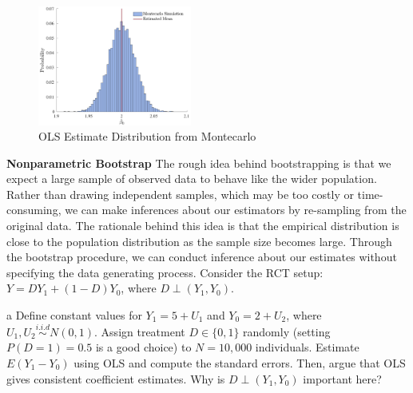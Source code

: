 \documentclass{article}
\begin{document}
\begin{solution}
\begin{equation*}
\end{equation*}
\begin{figure}[htb]
    \centering
    \caption{OLS Estimate Distribution from Montecarlo}
    \label{ea3:ps1:q3a:fig1}
    \includegraphics[width=0.45\textwidth]{Figures/p3qa.pdf}
\end{figure}

\end{solution}
\FloatBarrier
\underline{\hspace{\textwidth}}
\textbf{Nonparametric Bootstrap}
The rough idea behind bootstrapping is that we expect a large sample of observed data to behave like the wider population. Rather than drawing independent samples, which may be too costly or time-consuming, we can make inferences about our estimators by re-sampling from the original data. The rationale behind this idea is that the empirical distribution is close to the population distribution as the sample size becomes large. Through the bootstrap procedure, we can conduct inference about our estimates without specifying the data generating process. Consider the RCT setup: $Y=D Y_{1}+(1-D) Y_{0}$, where $D \perp\left(Y_{1}, Y_{0}\right)$.
\begin{problem}{a}
Define constant values for $Y_{1}=5+U_{1}$ and $Y_{0}=2+U_{2}$, where $U_{1}, U_{2} \stackrel{i . i . d}{\sim} N(0,1)$. Assign treatment $D \in\{0,1\}$ randomly (setting $P(D=1)=0.5$ is a good choice) to $N=10,000$ individuals. Estimate $E\left(Y_{1}-Y_{0}\right)$ using OLS and compute the standard errors. Then, argue that OLS gives consistent coefficient estimates. Why is $D \perp\left(Y_{1}, Y_{0}\right)$ important here?
\end{problem}
\end{document}
